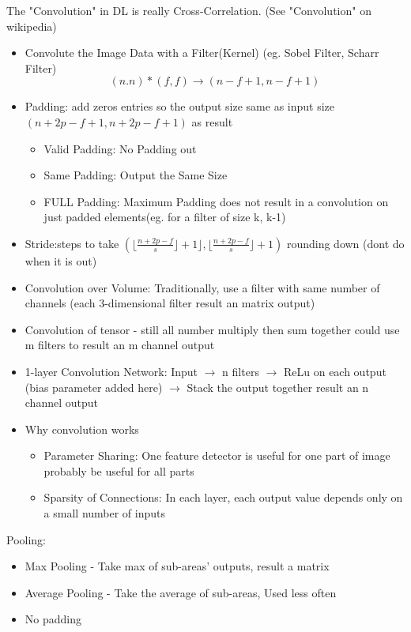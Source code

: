 \documentclass[11pt, openany]{book}              %
\begin{document}
The "Convolution" in DL is really Cross-Correlation. (See "Convolution" on wikipedia)
\begin{itemize}
\item Convolute the Image Data with a Filter(Kernel) (eg. Sobel Filter, Scharr Filter)
$$(n.n) * (f, f) \rightarrow (n-f+1, n-f+1)$$
\item Padding: add zeros entries so the output size same as input size
$(n+2p-f+1, n+2p-f+1)$ as result
\begin{itemize}
	\item Valid Padding: No Padding out
	\item Same Padding: Output the Same Size
	\item FULL Padding: Maximum Padding does not result in a convolution on just padded elements(eg. for a filter of size k, k-1)
\end{itemize}
\item Stride:steps to take
$(\lfloor \frac{n+2p−f}{s}⌋+1 \rfloor, \lfloor \frac{n+2p−f}{s}\rfloor + 1)$ rounding down (dont do when it is out)
\item Convolution over Volume: Traditionally, use a filter with same number of channels (each 3-dimensional filter result an matrix output)
\item Convolution of tensor - still all number multiply then sum together
could use m filters to result an m channel output
\item 1-layer Convolution Network: Input $\rightarrow$ n filters $\rightarrow$ ReLu on each output (bias parameter added here) $\rightarrow$ Stack the output together result an n channel output 
\item Why convolution works
	\begin{itemize}
	\item Parameter Sharing: One feature detector is useful for one part of image probably be useful for all parts
	\item Sparsity of Connections: In each layer, each output value depends only on a small number of inputs
	\end{itemize}
\end{itemize}

Pooling:
\begin{itemize}
	\item Max Pooling - Take max of sub-areas' outputs, result a matrix
	\item Average Pooling - Take the average of sub-areas, Used less often
	\item No padding
\end{itemize}
\end{document}
